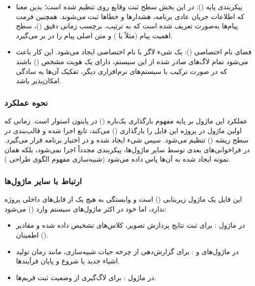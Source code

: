 \documentclass{article}
\begin{document}
\begin{itemize}
	\item پیکربندی پایه (): در این بخش سطح ثبت وقایع روی  تنظیم شده است؛ بدین معنا که اطلاعات جریان عادی برنامه، هشدارها و خطاها ثبت می‌شوند. همچنین فرمت پیام‌ها به‌صورت  تعریف شده است که به ترتیب، برچسب زمانی دقیق ()، سطح اهمیت پیام (مثلاً  یا ) و متن اصلی پیام را در بر می‌گیرد.
	
	\item فضای نام اختصاصی (): یک شیء لاگر با نام اختصاصی  ایجاد می‌شود. این کار باعث می‌شود تمام لاگ‌های صادر شده از این سیستم، دارای یک هویت مشخص () باشند که در صورت ترکیب با سیستم‌های نرم‌افزاری دیگر، تفکیک آن‌ها به سادگی امکان‌پذیر باشد.
\end{itemize}

\subsubsection{نحوه عملکرد}
عملکرد این ماژول بر پایه مفهوم بارگذاری یک‌باره () در پایتون استوار است. زمانی که اولین ماژول در پروژه این فایل را بارگذاری () می‌کند، تابع  اجرا شده و قالب‌بندی در سطح ریشه () تنظیم می‌شود. سپس شیء  ایجاد شده و در اختیار برنامه قرار می‌گیرد. در فراخوانی‌های بعدی توسط سایر ماژول‌ها، پیکربندی مجدداً اجرا نمی‌شود، بلکه همان نمونه  ایجاد شده به آن‌ها پاس داده می‌شود (شبیه‌سازی مفهوم الگوی طراحی ).

\subsubsection{ارتباط با سایر ماژول‌ها}
این فایل یک ماژول زیربنایی () است و وابستگی به هیچ یک از فایل‌های داخلی پروژه ندارد، اما خود در اکثر ماژول‌های سیستم وارد () می‌شود:

\begin{itemize}
	\item در ماژول : برای ثبت نتایج پردازش تصویر، کلاس‌های تشخیص داده شده و مقادیر اطمینان ().
	\item در ماژول‌های  و : برای گزارش‌دهی از چرخه حیات شبیه‌سازی، مانند زمان تولید اشیاء جدید یا شروع و پایان فرآیندها.
	\item در ماژول : برای لاگ‌گیری از وضعیت ثبت فریم‌ها.
\end{itemize}
\end{document}
